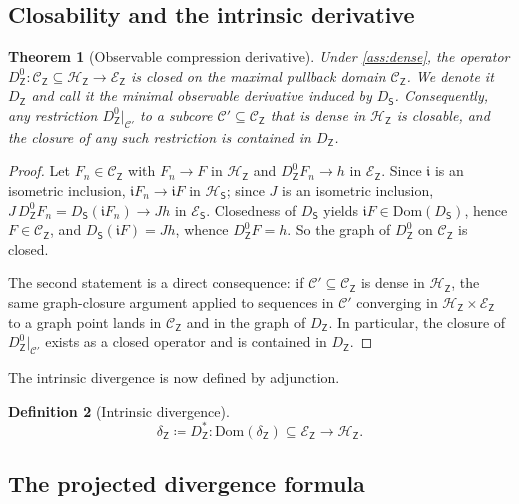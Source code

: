 \documentclass[11pt,reqno]{amsart}
\theoremstyle{plain}
\newtheorem{theorem}{Theorem}[section]
\theoremstyle{definition}
\newtheorem{definition}[theorem]{Definition}
\theoremstyle{remark}
\newcommand{\Hilb}{\mathcal{H}}
\newcommand{\Dom}{\mathrm{Dom}}
\newcommand{\Energy}{\mathcal{E}}
\newcommand{\Source}{\mathsf{S}}
\newcommand{\Obs}{\mathsf{Z}}
\renewcommand{\iota}{\mathfrak{i}}
\begin{document}
\subsection*{Closability and the intrinsic derivative}

\begin{theorem}[Observable compression derivative]\label{thm:compression}
Under \cref{ass:dense}, the operator
$D_\Obs^{0}\colon\mathcal C_\Obs\subseteq\Hilb_\Obs\to\Energy_\Obs$ is
closed on the maximal pullback domain $\mathcal C_\Obs$. We denote it
$D_\Obs$ and call it the \emph{minimal observable derivative} induced by
$D_\Source$. Consequently, any restriction
$D_\Obs^{0}|_{\mathcal C'}$ to a subcore
$\mathcal C'\subseteq\mathcal C_\Obs$ that is dense in $\Hilb_\Obs$ is
closable, and the closure of any such restriction is contained in
$D_\Obs$.
\end{theorem}

\begin{proof}
Let $F_n\in\mathcal C_\Obs$ with $F_n\to F$ in $\Hilb_\Obs$ and
$D_\Obs^{0}F_n\to h$ in $\Energy_\Obs$. Since $\iota$ is an isometric
inclusion, $\iota F_n\to\iota F$ in $\Hilb_\Source$; since $J$ is an
isometric inclusion,
$J\,D_\Obs^{0}F_n=D_\Source(\iota F_n)\to Jh$ in $\Energy_\Source$.
Closedness of $D_\Source$ yields $\iota F\in\Dom(D_\Source)$, hence
$F\in\mathcal C_\Obs$, and $D_\Source(\iota F)=Jh$, whence
$D_\Obs^{0}F=h$. So the graph of $D_\Obs^{0}$ on $\mathcal C_\Obs$ is
closed.

The second statement is a direct consequence: if
$\mathcal C'\subseteq\mathcal C_\Obs$ is dense in $\Hilb_\Obs$, the same
graph-closure argument applied to sequences in $\mathcal C'$ converging
in $\Hilb_\Obs\times\Energy_\Obs$ to a graph point lands in
$\mathcal C_\Obs$ and in the graph of $D_\Obs$. In particular, the
closure of $D_\Obs^{0}|_{\mathcal C'}$ exists as a closed operator and
is contained in $D_\Obs$.
\end{proof}

The intrinsic divergence is now defined by adjunction.

\begin{definition}[Intrinsic divergence]\label{def:int-div}
\[
  \delta_\Obs\coloneqq D_\Obs^{*}\colon\Dom(\delta_\Obs)\subseteq\Energy_\Obs
  \longrightarrow\Hilb_\Obs.
\]
\end{definition}

\subsection*{The projected divergence formula}
\end{document}
